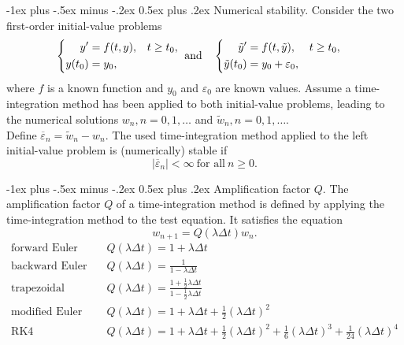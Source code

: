\documentclass[10pt,landscape,a4paper]{article}
\makeatletter
\renewcommand{\section}{\@startsection{section}{1}{0mm}%
	{-1ex plus -.5ex minus -.2ex}%
	{0.5ex plus .2ex}%
	{\normalfont\large\bfseries}}
\makeatother
\begin{document}
\begin{multicols}{3}
		\section{Numerical stability.}
		Consider the two first-order initial-value problems
		\[
			\begin{cases}
				\begin{aligned}
					y'&=f(t,y), &t\geq t_0, \\ y(t_0)&=y_0,&
				\end{aligned}
			\end{cases}
			\ \mkern-18mu\text{and} \quad
			\begin{cases}
				\begin{aligned}
					\tilde{y}'&=f(t,\tilde{y}), &t\geq t_0, \\ \tilde{y}(t_0)&=y_0+\varepsilon_0,&
				\end{aligned}
			\end{cases}
		\]
		where $ f $ is a known function and $ y_0 $ and $ \varepsilon_0 $ are known values. Assume a time-integration method has been applied to both initial-value problems, leading to the numerical solutions $ w_n, n=0,1,\hdots $ and $ \tilde{w}_n, n=0,1,\hdots $.\\
		Define $ \overline{\varepsilon}_n = \tilde{w}_n-w_n $. The used time-integration method applied to the left initial-value problem is (numerically) stable if
		\[
			|\overline{\varepsilon}_n| < \infty \ \text{for all} \ n\geq0.
		\]
		
		\section{Amplification factor $ Q $.}
		The amplification factor $ Q $ of a time-integration method is defined by applying the time-integration method to the test equation. It satisfies the equation
		\[
			w_{n+1} = Q(\lambda\Delta t)w_n.
		\]
			\begin{align*}
				\text{forward Euler} \quad &Q(\lambda\Delta t) = 1 + \lambda\Delta t\\
				\text{backward Euler} \quad &Q(\lambda\Delta t) = \frac{1}{1-\lambda\Delta t}\\
				\text{trapezoidal} \quad &Q(\lambda\Delta t) = \frac{1+\frac{1}{2}\lambda\Delta t}{1-\frac{1}{2}\lambda\Delta t}\\
				\text{modified Euler} \quad &Q(\lambda\Delta t) = 1 + \lambda\Delta t + \frac{1}{2}(\lambda\Delta t)^2\\
				\text{RK4} \quad &Q(\lambda\Delta t) = 1 + \lambda\Delta t + \frac{1}{2}(\lambda\Delta t)^2 + \frac{1}{6}(\lambda\Delta t)^3 + \frac{1}{24}(\lambda\Delta t)^4
			\end{align*}
		

\end{multicols}
\end{document}
